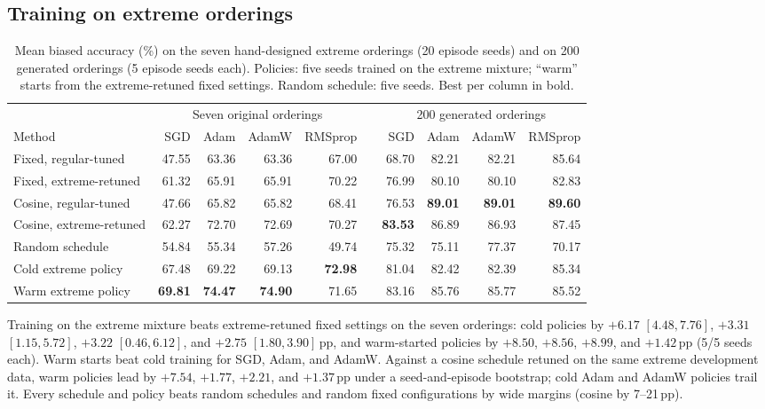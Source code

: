 \documentclass{article}
\newcommand{\pp}{\ensuremath{\,\mathrm{pp}}}
\begin{document}
\subsection{Training on extreme orderings}
\begin{table}[t]
\centering
\caption{Mean biased accuracy (\%) on the seven hand-designed extreme orderings (20 episode seeds) and on 200 generated orderings (5 episode seeds each). Policies: five seeds trained on the extreme mixture; ``warm'' starts from the extreme-retuned fixed settings. Random schedule: five seeds. Best per column in bold.}
\label{tab:extreme}
\small\setlength{\tabcolsep}{3.5pt}
\begin{tabular}{lrrrrcrrrr}
\toprule
&\multicolumn{4}{c}{Seven original orderings}&&\multicolumn{4}{c}{200 generated orderings}\\
\cmidrule(lr){2-5}\cmidrule(lr){7-10}
Method&SGD&Adam&AdamW&RMSprop&&SGD&Adam&AdamW&RMSprop\\
\midrule
Fixed, regular-tuned&47.55&63.36&63.36&67.00&&68.70&82.21&82.21&85.64\\
Fixed, extreme-retuned&61.32&65.91&65.91&70.22&&76.99&80.10&80.10&82.83\\
Cosine, regular-tuned&47.66&65.82&65.82&68.41&&76.53&\textbf{89.01}&\textbf{89.01}&\textbf{89.60}\\
Cosine, extreme-retuned&62.27&72.70&72.69&70.27&&\textbf{83.53}&86.89&86.93&87.45\\
Random schedule&54.84&55.34&57.26&49.74&&75.32&75.11&77.37&70.17\\
Cold extreme policy&67.48&69.22&69.13&\textbf{72.98}&&81.04&82.42&82.39&85.34\\
Warm extreme policy&\textbf{69.81}&\textbf{74.47}&\textbf{74.90}&71.65&&83.16&85.76&85.77&85.52\\
\bottomrule
\end{tabular}
\end{table}
Training on the extreme mixture beats extreme-retuned fixed settings on the seven orderings: cold policies by $+6.17$ $[4.48,7.76]$, $+3.31$ $[1.15,5.72]$, $+3.22$ $[0.46,6.12]$, and $+2.75$ $[1.80,3.90]\pp$, and warm-started policies by $+8.50$, $+8.56$, $+8.99$, and $+1.42\pp$ (5/5 seeds each). Warm starts beat cold training for SGD, Adam, and AdamW. Against a cosine schedule retuned on the same extreme development data, warm policies lead by $+7.54$, $+1.77$, $+2.21$, and $+1.37\pp$ under a seed-and-episode bootstrap; cold Adam and AdamW policies trail it. Every schedule and policy beats random schedules and random fixed configurations by wide margins (cosine by 7--21\pp).
\end{document}
